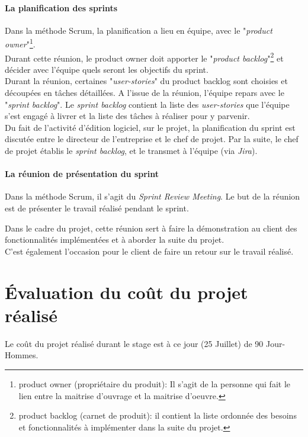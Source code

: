 \paragraph*{La planification des sprints}
Dans la méthode Scrum, la planification a lieu en équipe, avec le "\textit{product owner}"\footnote{product owner (propriétaire du produit): Il s'agit de la personne qui fait le lien entre la maitrise d'ouvrage et la maitrise d'oeuvre.}. \\
Durant cette réunion, le product owner doit apporter le "\textit{product backlog}"\footnote{product backlog (carnet de produit): il contient la liste ordonnée des besoins et fonctionnalités à implémenter dans la suite du projet.} et décider avec l'équipe quels seront les objectifs du sprint.\\
Durant la réunion, certaines "\textit{user-stories}" du product backlog sont choisies et découpées en tâches détaillées. A l'issue de la réunion, l'équipe repars avec le "\textit{sprint backlog}". Le \textit{sprint backlog} contient la liste des \textit{user-stories} que l'équipe s'est engagé à livrer et la liste des tâches à réaliser pour y parvenir.\\

Du fait de l'activité d'édition logiciel, sur le projet, la planification du sprint est discutée entre le directeur de l'entreprise et le chef de projet. Par la suite, le chef de projet établis le \textit{sprint backlog}, et le transmet à l'équipe (via \textit{Jira}).

\paragraph*{La réunion de présentation du sprint}
Dans la méthode Scrum, il s'agit du \textit{Sprint Review Meeting}. Le but de la réunion est de présenter le travail réalisé pendant le sprint. 

Dans le cadre du projet, cette réunion sert à faire la démonstration au client des fonctionnalités implémentées et à aborder la suite du projet.\\
C'est également l'occasion pour le client de faire un retour sur le travail réalisé.


\section{Évaluation du coût du projet réalisé}
Le coût du projet réalisé durant le stage est à ce jour (25 Juillet) de 90 Jour-Hommes.
